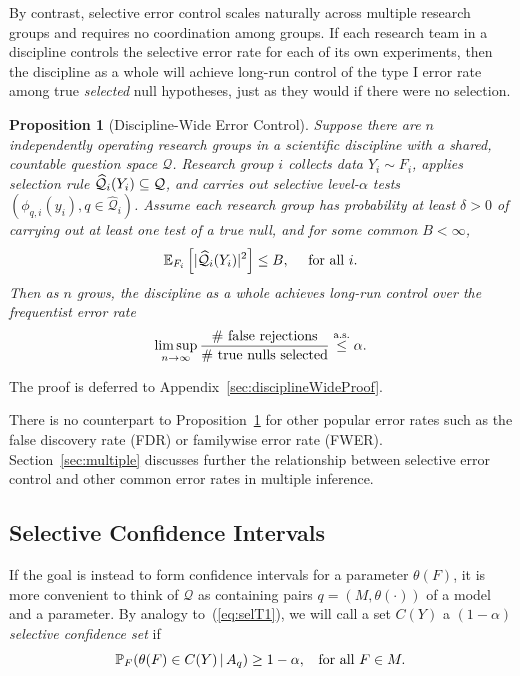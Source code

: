 \documentclass{article}
\newtheorem{proposition}[theorem]{Proposition}
\theoremstyle{definition}
\newcommand{\cQ}{\mathcal{Q}}
\newcommand{\hcQ}{\widehat{\mathcal{Q}}}
\newcommand{\leqAS}{\overset{\textrm{a.s.}}{\leq}}
\begin{document}
By contrast, selective error control scales naturally across multiple research groups and requires no coordination among groups. If each research team in a discipline controls the selective error rate for each of its own experiments, then the discipline as a whole will achieve long-run control of the type I error rate among true {\em selected} null hypotheses, just as they would if there were no selection.
\begin{proposition}[Discipline-Wide Error Control]\label{prop:disciplineWide}
Suppose there are $n$ independently operating research groups in a scientific discipline with a shared, countable question space $\cQ$. Research group $i$ collects data $Y_{i}\sim F_{i}$, applies selection rule $\hcQ_{i}(Y_{i})\sub \cQ$, and carries out selective level-$\alpha$ tests $(\phi_{q,i}(y_{i}), q\in\hcQ_{i})$.
Assume each research group has probability at least $\delta>0$ of carrying out at least one test of a true null, and for some common $B<\infty$,
\[\E_{F_{i}}\left[|\hcQ_{i}(Y_{i})|^2\right] \leq B,
\quad\text{ for all } i.\]
Then as $n$ grows, the discipline as a whole achieves long-run control over the frequentist error rate
\begin{equation}\label{eq:longRun}
  \limsup_{n\to\infty} \frac{\textnormal{\# false rejections}}{\textnormal{\# true nulls selected}} \leqAS \alpha.
\end{equation}
\end{proposition}
The proof is deferred to Appendix~\ref{sec:disciplineWideProof}. %

There is no counterpart to Proposition~\ref{prop:disciplineWide} for other popular error rates such as the false discovery rate (FDR) \citep{benjamini1995controlling} or familywise error rate (FWER). Section~\ref{sec:multiple} discusses further the relationship between selective error control and other common error rates in multiple inference.

\subsection{Selective Confidence Intervals}\label{sec:ci}

If the goal is instead to form confidence intervals for a parameter $\theta(F)$, it is more convenient to think of $\cQ$ as containing pairs $q = (M, \theta(\cdot))$ of a model and a parameter. By analogy to~(\ref{eq:selT1}), we will call a set $C(Y)$ a {\em $(1-\alpha)$ selective confidence set} if
\begin{equation}\label{eq:selConf}
  \mathbb{P}_F(\theta(F) \in C(Y) \,|\, A_q) \geq 1 - \alpha, \;\;\text{ for all } F\in M.
\end{equation}
\end{document}
